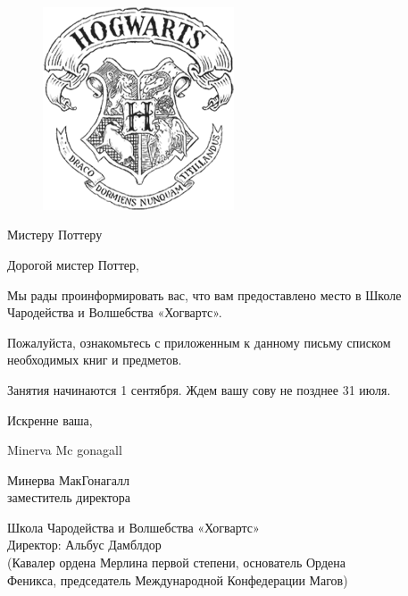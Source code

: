 \documentclass[14pt, a4paper]{article}
\begin{document}
\pagestyle{empty}

\begin{figure}[H]
\begin{center}
\includegraphics[height=6cm]{hogwarts.png}
\end{center}
\end{figure}

\vspace{1cm}

{\fontsize{12}{1}\selectfont Мистеру Поттеру}

\vspace{2.5cm}

Дорогой мистер Поттер,

Мы рады проинформировать вас, что вам предоставлено место в Школе Чародейства и Волшебства «Хогвартс».

Пожалуйста, ознакомьтесь с приложенным к данному письму списком необходимых книг и предметов.

Занятия начинаются 1 сентября. Ждем вашу сову не позднее 31 июля.


\vfill

Искренне ваша,

{ \fontsize{26}{1}\selectfont \hspace{3mm} Minerva Mc gonagall }

Минерва МакГонагалл \\
заместитель директора

\vspace{10mm}

\centering
Школа Чародейства и Волшебства «Хогвартс» \\
\vspace{2mm}
\small Директор: Альбус Дамблдор \\
(Кавалер ордена Мерлина первой степени, основатель Ордена \\ Феникса, председатель Международной Конфедерации Магов)
\end{document}

